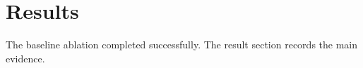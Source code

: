 \section{Results}
The baseline ablation completed successfully. The result section records the main evidence.
